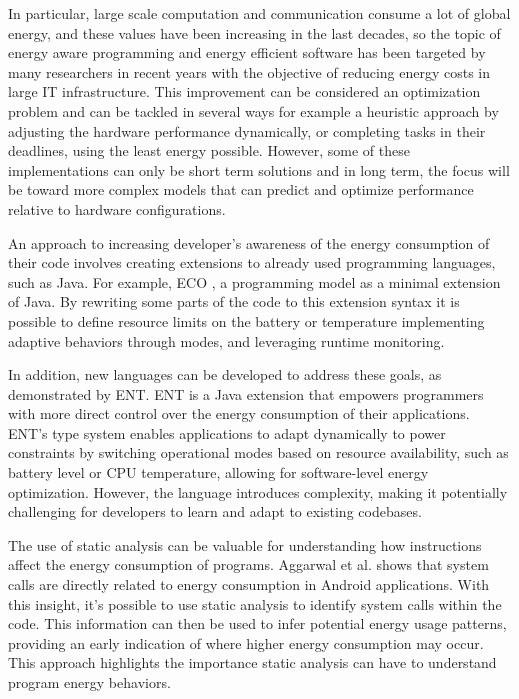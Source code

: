 \documentclass[sigplan]{acmart}
\begin{document}
In particular, large scale computation and communication consume a lot of global energy, and these values have been increasing in the last decades, so the topic of energy aware programming and energy efficient software has been targeted by many researchers in recent years with the objective of reducing energy costs in large IT infrastructure\cite{8880037}.
This improvement can be considered an optimization problem and can be tackled in several ways for example a heuristic approach by adjusting the hardware performance dynamically, or completing tasks in their deadlines, using the least energy possible. However, some of these implementations can only be short term solutions and in long term, the focus will be toward more complex models that can predict and optimize performance relative to hardware configurations\cite{10.1145/1666420.1666438}. 

An approach to increasing developer's awareness of the energy consumption of their code involves creating extensions to already used programming languages, such as Java. For example, ECO \cite{7194624}, a programming model as a minimal extension of Java. By rewriting some parts of the code to this extension syntax it is possible to define resource limits on the battery or temperature implementing adaptive behaviors through modes, and leveraging runtime monitoring.

In addition, new languages can be developed to address these goals, as demonstrated by ENT\cite{10.1145/3062341.3062356}. ENT is a Java extension that empowers programmers with more direct control over the energy consumption of their applications. ENT’s type system enables applications to adapt dynamically to power constraints by switching operational modes based on resource availability, such as battery level or CPU temperature, allowing for software-level energy optimization. However, the language introduces complexity, making it potentially challenging for developers to learn and adapt to existing codebases. 

The use of static analysis can be valuable for understanding how instructions affect the energy consumption of programs. Aggarwal et al.\cite{aggarwal2014power} shows that system calls are directly related to energy consumption in Android applications. With this insight, it's possible to use static analysis to identify system calls within the code. This information can then be used to infer potential energy usage patterns, providing an early indication of where higher energy consumption may occur. This approach highlights the importance static analysis can have to understand program energy behaviors.
\end{document}
